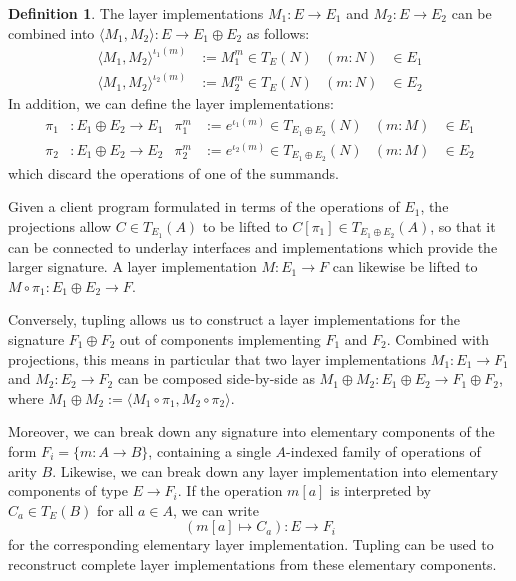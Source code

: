 \documentclass[11pt,oneside,draft]{book}
\theoremstyle{definition}
\newtheorem{definition}[theorem]{Definition}
\begin{document}
\begin{definition}
The layer implementations
$M_1 : E \rightarrow E_1$ and
$M_2 : E \rightarrow E_2$
can be combined into
$\langle M_1, M_2 \rangle : E \rightarrow E_1 \oplus E_2$
as follows:
\begin{align*}
  \langle M_1, M_2 \rangle^{\iota_1(m)} &:= M_1^m \in T_E(N) &
    (m \mathbin: N) &\in E_1 \\
  \langle M_1, M_2 \rangle^{\iota_2(m)} &:= M_2^m \in T_E(N) &
    (m \mathbin: N) &\in E_2
\end{align*}
In addition,
we can define the layer implementations:
\begin{align*}
  \pi_1 &: E_1 \oplus E_2 \rightarrow E_1 &
  \pi_1^m &:= e^{\iota_1(m)} \in T_{E_1 \oplus E_2}(N) &
  (m \mathbin: M) &\in E_1
  \\
  \pi_2 &: E_1 \oplus E_2 \rightarrow E_2 &
  \pi_2^m &:= e^{\iota_2(m)} \in T_{E_1 \oplus E_2}(N) &
  (m \mathbin: M) &\in E_2
\end{align*}
which discard the operations of one of the summands.
\end{definition}

Given a client program
formulated in terms of the operations of $E_1$,
the projections allow $C \in T_{E_1}(A)$
to be lifted to $C[\pi_1] \in T_{E_1 \oplus E_2}(A)$,
so that it can be connected
to underlay interfaces and implementations
which provide the larger signature.
A layer implementation
$M : E_1 \rightarrow F$
can likewise be lifted to
$M \circ \pi_1 : E_1 \oplus E_2 \rightarrow F$.

Conversely,
tupling allows us to construct a layer implementations
for the signature $F_1 \oplus F_2$
out of components implementing $F_1$ and $F_2$.
Combined with projections,
this means in particular that
two layer implementations $M_1 : E_1 \rightarrow F_1$
and $M_2 : E_2 \rightarrow F_2$
can be composed side-by-side as
$M_1 \oplus M_2 : E_1 \oplus E_2 \rightarrow F_1 \oplus F_2$,
where
$M_1 \oplus M_2 := \langle M_1 \circ \pi_1, M_2 \circ \pi_2 \rangle$.

Moreover,
we can break down any signature into elementary
components of the form $F_i = \{ m : A \rightarrow B \}$,
containing a single $A$-indexed family of operations of arity $B$.
Likewise,
we can break down any layer implementation into
elementary components of type $E \rightarrow F_i$.
If the operation $m[a]$
is interpreted by $C_a \in T_E(B)$ for all $a \in A$,
we can write
\[
  (m[a] \mapsto C_a) : E \rightarrow F_i
\]
for the corresponding elementary layer implementation.
Tupling can be used to reconstruct complete layer implementations
from these elementary components.
\end{document}
